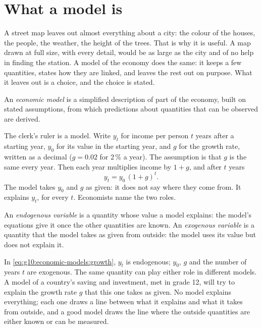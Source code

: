 \section{What a model is}\label{sec:g10:economic-models:what}

A street map leaves out almost everything about a city: the colour of the houses, the people,
the weather, the height of the trees. That is why it is useful. A map drawn at full size, with
every detail, would be as large as the city and of no help in finding the station. A model of the
economy does the same: it keeps a few quantities, states how they are linked, and leaves the rest
out on purpose. What it leaves out is a choice, and the choice is stated.

\begin{definition}\label{def:g10:economic-models:model}
An \emph{economic model} is a simplified description of part of the economy,
built on stated assumptions, from which predictions about quantities that can be observed are
derived.
\end{definition}

The clerk's ruler is a model. Write $y_t$ for income per person $t$ years after a starting year,
$y_0$ for its value in the starting year, and $g$ for the growth rate, written as a decimal ($g =
0.02$ for 2\,\% a year). The assumption is that $g$ is the same every year. Then each year
multiplies income by $1+g$, and after $t$ years
\begin{equation}\label{eq:g10:economic-models:growth}
  y_t = y_0\,(1+g)^t .
\end{equation}
The model takes $y_0$ and $g$ as given: it does not say where they come from. It explains $y_t$,
for every $t$. Economists name the two roles.

\begin{definition}\label{def:g10:economic-models:endogenous}
An \emph{endogenous variable} is a quantity whose value a model
explains: the model's equations give it once the other quantities are known. An \emph{exogenous
variable} is a quantity that the model takes as given from outside: the
model uses its value but does not explain it.
\end{definition}
\label{def:g10:economic-models:exogenous}

In \eqref{eq:g10:economic-models:growth}, $y_t$ is endogenous; $y_0$, $g$ and the number of years
$t$ are exogenous. The same quantity can play either role in different models. A model of a
country's saving and investment, met in grade 12, will try to explain the growth rate $g$ that
this one takes as given. No model explains everything; each one draws a line between what it
explains and what it takes from outside, and a good model draws the line where the outside
quantities are either known or can be measured.

